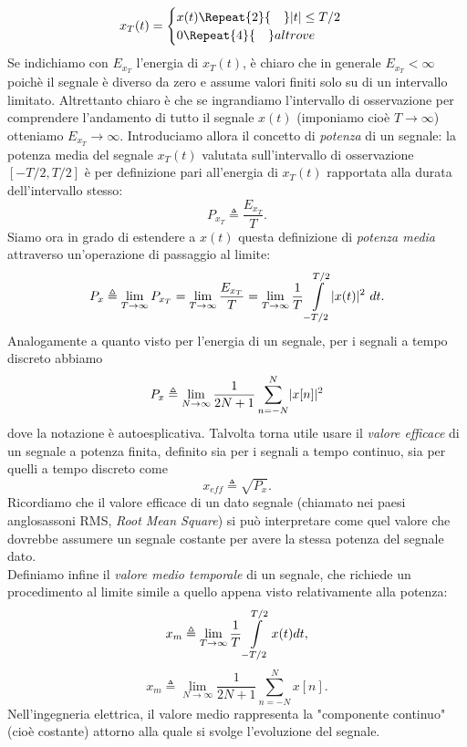\documentclass[12pt,oneside,openany]{memoir}
\numberwithin{equation}{subsection}
\DeclarePairedDelimiter{\abs}{\lvert}{\rvert}
\newcommand{\quads}[1]{\Repeat{#1}{\quad}}
\newcommand{\dt}{\ dt}
\begin{document}
\begin{equation}
	x_T(t) =	\begin{cases}
				x(t) \quads{2} \abs{t} \leq T/2\\
				0 \quads{4} altrove
			\end{cases}
\end{equation}
Se indichiamo con $E_{x_T}$ l'energia di $x_T(t)$, \`e chiaro che in generale $E_{x_T} < \infty$ poich\`e il segnale \`e diverso da zero e assume valori finiti solo su di un intervallo limitato. Altrettanto chiaro \`e che se ingrandiamo l'intervallo di osservazione per comprendere l'andamento di tutto il segnale $x(t)$ (imponiamo cio\`e $T \rightarrow \infty$) otteniamo $E_{x_T} \rightarrow \infty$. Introduciamo allora il concetto di \textit{potenza} di un segnale: la potenza media del segnale $x_T(t)$ valutata sull'intervallo di osservazione $\left[-T/2, T/2\right]$ \`e per definizione pari all'energia di $x_T(t)$ rapportata alla durata dell'intervallo stesso:
\begin{equation}
	P_{x_T} \triangleq \frac{E_{x_T}}{T}.
\end{equation}
Siamo ora in grado di estendere a $x(t)$ questa definizione di \textit{potenza media} attraverso un'operazione di passaggio al limite:
\begin{equation}\label{eq:signal_power}
	P_x \triangleq \lim_{T \rightarrow \infty} P_{x_T} = \lim_{T \rightarrow \infty} \frac{E_{x_T}}{T} = \lim_{T \rightarrow \infty} \frac{1}{T} \int\displaylimits_{-T/2}^{T/2} \abs{x(t)}^2 \dt.
\end{equation}
Analogamente a quanto visto per l'energia di un segnale, per i segnali a tempo discreto abbiamo
\begin{equation}
	P_x \triangleq \lim_{N \rightarrow \infty} \frac{1}{2N + 1} \sum_{n = -N}^{N} \abs{x[n]}^2
\end{equation}
dove la notazione \`e autoesplicativa.
Talvolta torna utile usare il \textit{valore efficace} di un segnale a potenza finita, definito sia per i segnali a tempo continuo, sia per quelli a tempo discreto come
\begin{equation}
	x_{eff} \triangleq \sqrt{P_x}.
\end{equation}
Ricordiamo che il valore efficace di un dato segnale (chiamato nei paesi anglosassoni RMS, \textit{Root Mean Square}) si pu\`o interpretare come quel valore che dovrebbe assumere un segnale costante per avere la stessa potenza del segnale dato.\\
Definiamo infine il \textit{valore medio temporale} di un segnale, che richiede un procedimento al limite simile a quello appena visto relativamente alla potenza:
\begin{equation}
	x_m \triangleq \lim_{T \rightarrow \infty} \frac{1}{T} \int\displaylimits_{-T/2}^{T/2} x(t) dt,
\end{equation}
\begin{equation}
	x_m \triangleq \lim_{N \rightarrow \infty} \frac{1}{2N + 1} \sum_{n = -N}^{N} x[n].
\end{equation}
Nell'ingegneria elettrica, il valore medio rappresenta la "componente continuo" (cio\`e costante) attorno alla quale si svolge l'evoluzione del segnale.
\end{document}
